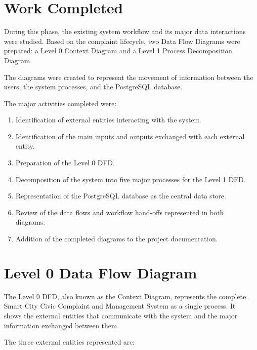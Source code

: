 \documentclass[12pt,a4paper]{article}
\begin{document}
\section{Work Completed}

During this phase, the existing system workflow and its major data
interactions were studied. Based on the complaint lifecycle, two Data Flow
Diagrams were prepared: a Level 0 Context Diagram and a Level 1 Process
Decomposition Diagram.

The diagrams were created to represent the movement of information between
the users, the system processes, and the PostgreSQL database.

The major activities completed were:

\begin{enumerate}[leftmargin=*]
    \item Identification of external entities interacting with the system.
    \item Identification of the main inputs and outputs exchanged with each
    external entity.
    \item Preparation of the Level 0 DFD.
    \item Decomposition of the system into five major processes for the
    Level 1 DFD.
    \item Representation of the PostgreSQL database as the central data store.
    \item Review of the data flows and workflow hand-offs represented in
    both diagrams.
    \item Addition of the completed diagrams to the project documentation.
\end{enumerate}

\section{Level 0 Data Flow Diagram}

The Level 0 DFD, also known as the Context Diagram, represents the complete
Smart City Civic Complaint and Management System as a single process. It
shows the external entities that communicate with the system and the major
information exchanged between them.

The three external entities represented are:
\end{document}
